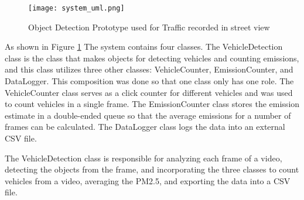 \begin{figure}[h!]
	\texttt{[image: system\_uml.png]}
	\caption{Object Detection Prototype used for Traffic recorded in street view}
	\label{fig:system_uml}
\end{figure}

As shown in Figure \ref{fig:system_uml} The system contains four classes. The VehicleDetection class is the class that makes objects for detecting vehicles and counting emissions, and this class utilizes three other classes: VehicleCounter, EmissionCounter, and DataLogger. This composition was done so that one class only has one role. The VehicleCounter class serves as a click counter for different vehicles and was used to count vehicles in a single frame. The EmissionCounter class stores the emission estimate in a double-ended queue so that the average emissions for a number of frames can be calculated. The DataLogger class logs the data into an external CSV file. 

The VehicleDetection class is responsible for analyzing each frame of a video, detecting the objects from the frame, and incorporating the three classes to count vehicles from a video, averaging the PM2.5, and exporting the data into a CSV file.

